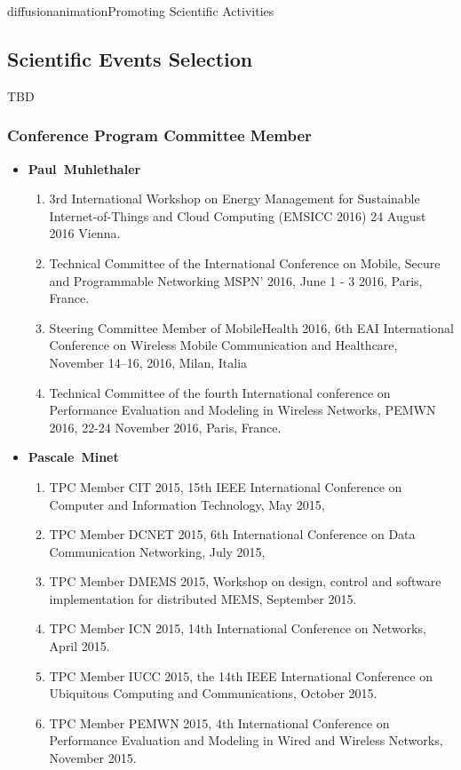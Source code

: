 \documentclass{ra2016}
\newcommand{\paul}  {\textbf{Paul~Muhlethaler}}
\newcommand{\pascale} {\textbf{Pascale~Minet}}
\begin{document}
\begin{module}{diffusion}{animation}{Promoting Scientific Activities}
    
\subsection {Scientific Events Selection}

TBD 

 \subsubsection {Conference Program Committee Member}

\begin{itemize}
    \item \paul
        \begin{enumerate}
             \item 3rd International Workshop on Energy Management for Sustainable Internet-of-Things and Cloud Computing (EMSICC 2016) 24 August 2016 Vienna. 
             \item Technical Committee of the International Conference on Mobile, Secure and Programmable Networking MSPN' 2016, June 1 - 3 2016, Paris, France. 
            \item Steering Committee Member of MobileHealth 2016, 6th  EAI International Conference on Wireless Mobile Communication and Healthcare,  November 14–16, 2016, Milan, Italia   
            \item Technical Committee of the fourth International conference on Performance Evaluation and Modeling in Wireless Networks, PEMWN 2016, 22-24 November 2016, Paris, France. 
        \end{enumerate}
    \item \pascale
        \begin{enumerate}
            \item TPC Member CIT 2015, 15th IEEE International Conference on Computer and Information Technology, May 2015,
            \item TPC Member DCNET 2015, 6th International Conference on Data Communication Networking, July 2015,
            \item TPC Member DMEMS 2015, Workshop on design, control and software implementation for distributed MEMS, September 2015.
            \item TPC Member ICN 2015, 14th International Conference on Networks, April 2015.
            \item TPC Member IUCC 2015, the 14th IEEE International Conference on Ubiquitous Computing and Communications, October 2015.
            \item TPC Member PEMWN 2015, 4th International Conference on Performance Evaluation and Modeling in Wired and Wireless Networks, November 2015.

\end{enumerate}
\end{itemize}
\end{module}
\end{document}
